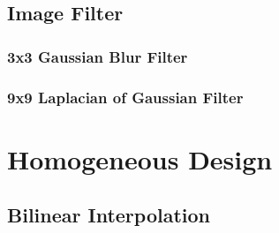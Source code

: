 \subsection{Image Filter}
\subsubsection{3x3 Gaussian Blur Filter}
\subsubsection{9x9 Laplacian of Gaussian Filter}

\section{Homogeneous Design}
\subsection{Bilinear Interpolation}

